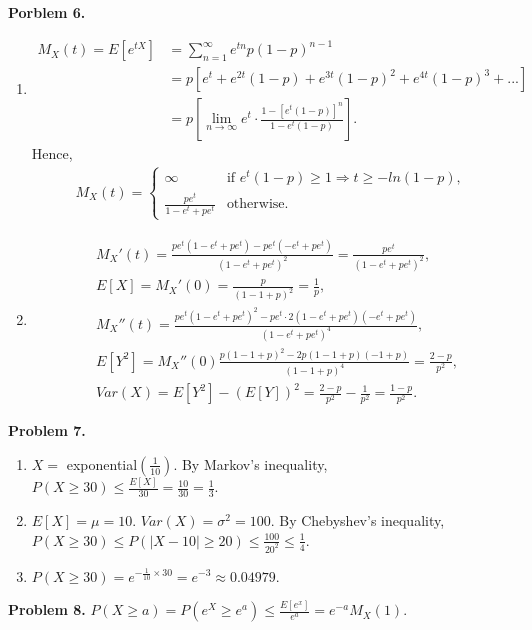 \documentclass{article}
\begin{document}
\textbf{Porblem 6.}
\begin{enumerate}[label={(\alph*)}]
    \item 
    \begin{align}
        M_X(t)=E[e^{tX}]&=\sum_{n=1}^{\infty}e^{tn}p(1-p)^{n-1}\\
        &=p\left[e^t+e^{2t}(1-p)+e^{3t}(1-p)^2+e^{4t}(1-p)^3+...\right]\\
        &=p\left[\lim_{n\rightarrow\infty}e^t\cdot\frac{1-[e^t(1-p)]^n}{1-e^t(1-p)}\right].
    \end{align}
    Hence,
    \begin{align}
        M_X(t)=
        \begin{cases}
            \infty &\text{if }e^t(1-p)\ge1\Rightarrow t\ge -ln(1-p),\\
            \frac{pe^t}{1-e^t+pe^t} &\text{otherwise}.
        \end{cases}
    \end{align}

    \item
    \begin{align}
        &M_X'(t)=\frac{pe^t(1-e^t+pe^t)-pe^t(-e^t+pe^t)}{(1-e^t+pe^t)^2}=\frac{pe^t}{(1-e^t+pe^t)^2},\\
        &E[X]=M_X'(0)=\frac{p}{(1-1+p)^2}=\frac{1}{p},\\
        &M_X''(t)=\frac{pe^t(1-e^t+pe^t)^2-pe^t\cdot2(1-e^t+pe^t)(-e^t+pe^t)}{(1-e^t+pe^t)^4},\\
        &E[Y^2]=M_X''(0)\frac{p(1-1+p)^2-2p(1-1+p)(-1+p)}{(1-1+p)^4}=\frac{2-p}{p^2},\\
        &Var(X)=E[Y^2]-(E[Y])^2=\frac{2-p}{p^2}-\frac{1}{p^2}=\frac{1-p}{p^2}.
    \end{align}
\end{enumerate}
\bigbreak

\textbf{Problem 7.}
\begin{enumerate}[label={(\alph*)}]
    \item $X=$ exponential$(\frac{1}{10})$. By Markov's inequality, $P(X\ge 30) \le \frac{E[X]}{30} = \frac{10}{30} = \frac{1}{3}$.

    \item 
    $E[X]=\mu=10$. $Var(X)=\sigma^2=100$. 
    By Chebyshev's inequality, $P(X\ge 30)\le P(|X-10|\ge 20)\le \frac{100}{20^2}\le\frac{1}{4}$.

    \item 
    $P(X\ge 30)=e^{-\frac{1}{10}\times 30}=e^{-3}\approx0.04979$.
\end{enumerate}
\bigbreak

\textbf{Problem 8.}
$P(X\ge a)=P(e^X\ge e^a)\le \frac{E[e^x]}{e^a}=e^{-a}M_X(1)$.
\end{document}
